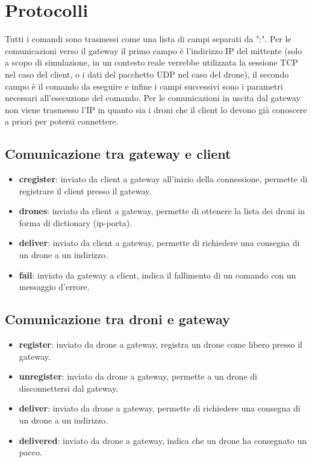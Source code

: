 \documentclass[a4paper,12pt]{report}
\begin{document}
\chapter{Protocolli}
Tutti i comandi sono trasmessi come una lista di campi separati da ":". 
Per le comunicazioni verso il gateway il primo campo è l'indirizzo IP del mittente (solo a scopo di simulazione, in un contesto reale verrebbe utilizzata la sessione TCP 
nel caso del client, o i dati del pacchetto UDP nel caso del drone), il secondo campo è il comando da eseguire e infine i campi successivi sono i parametri necessari 
all'esecuzione del comando.
Per le comunicazioni in uscita dal gateway non viene trasmesso l'IP in quanto sia i droni che il client lo devono già conoscere a priori per potersi connettere.
\section{Comunicazione tra gateway e client}
\begin{itemize}
    \item \textbf{cregister}: inviato da client a gateway all'inizio della connessione, permette di registrare il client presso il gateway.
    \item \textbf{drones}: inviato da client a gateway, permette di ottenere la lista dei droni in forma di dictionary (ip-porta).
    \item \textbf{deliver}: inviato da client a gateway, permette di richiedere una consegna di un drone a un indirizzo.
    \item \textbf{fail}: inviato da gateway a client, indica il fallimento di un comando con un messaggio d'errore.
\end{itemize}
\section{Comunicazione tra droni e gateway}
\begin{itemize}
    \item \textbf{register}: inviato da drone a gateway, registra un drone come libero presso il gateway.
    \item \textbf{unregister}: inviato da drone a gateway, permette a un drone di disconnettersi dal gateway.
    \item \textbf{deliver}: inviato da drone a gateway, permette di richiedere una consegna di un drone a un indirizzo.
    \item \textbf{delivered}: inviato da drone a gateway, indica che un drone ha consegnato un pacco.
\end{itemize}
\end{document}
